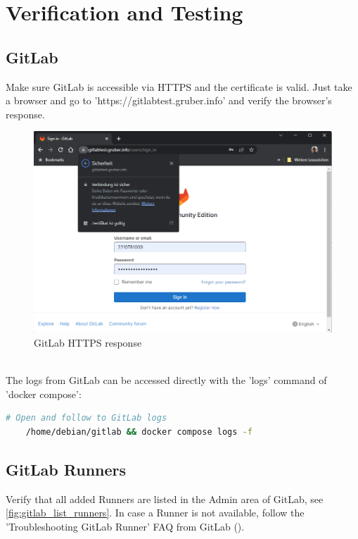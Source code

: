 \chapter{Verification and Testing}

\section{GitLab}

Make sure GitLab is accessible via HTTPS and the certificate is valid.
Just take a browser and go to 'https://gitlabtest.gruber.info' and verify the browser's response.

\begin{figure}[H]
	\centering
	\includegraphics[width=14cm]{images/gitlab_signin.png}
	\caption{GitLab HTTPS response}
	\label{fig:gitlab_response}
\end{figure}
\  \\

The logs from GitLab can be accessed directly with the 'logs' command of 'docker compose':
\begin{lstlisting}[language=bash,caption={GitLab Logging},label={code:gitlab-logging}]
    # Open and follow to GitLab logs
    /home/debian/gitlab && docker compose logs -f
\end{lstlisting}

\section{GitLab Runners}

Verify that all added Runners are listed in the Admin area of GitLab, see \ref{fig:gitlab_list_runners}.
In case a Runner is not available, follow the 'Troubleshooting GitLab Runner' FAQ from GitLab (\cite{refGitLabRunnersTroubleshooting}).

